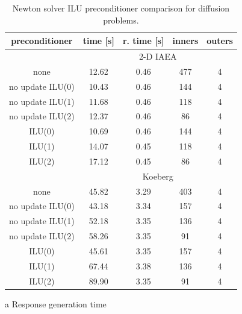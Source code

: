 \begin{table}[ht] 
 \begin{center} 
 
 \begin{threeparttable}

 \begin{tabular}{ccccc} 
 \toprule 
  preconditioner & time [s] & r. time [s]\tnote{a} & inners & outers \\
 \midrule 
 &  \multicolumn{4}{c}{2-D IAEA} \\ 
 \midrule 
          none &     12.62 &      0.46 &          477 &            4 \\ 
  no update ILU(0) &     10.43 &      0.46 &          144 &            4 \\ 
  no update ILU(1) &     11.68 &      0.46 &          118 &            4 \\ 
  no update ILU(2) &     12.37 &      0.46 &           86 &            4 \\ 
        ILU(0) &     10.69 &      0.46 &          144 &            4 \\ 
        ILU(1) &     14.07 &      0.45 &          118 &            4 \\ 
        ILU(2) &     17.12 &      0.45 &           86 &            4 \\ 
 \midrule 
 &  \multicolumn{4}{c}{Koeberg} \\ 
 \midrule 
          none &     45.82 &      3.29 &          403 &            4 \\ 
  no update ILU(0) &     43.18 &      3.34 &          157 &            4 \\ 
  no update ILU(1) &     52.18 &      3.35 &          136 &            4 \\ 
  no update ILU(2) &     58.26 &      3.35 &           91 &            4 \\ 
        ILU(0) &     45.61 &      3.35 &          157 &            4 \\ 
        ILU(1) &     67.44 &      3.38 &          136 &            4 \\ 
        ILU(2) &     89.90 &      3.35 &           91 &            4 \\ 
 \bottomrule 
 \end{tabular} 
 

 {\footnotesize
 \begin{tablenotes}
   \item[a] Response generation time
 \end{tablenotes}
 }
 \end{threeparttable}
 
 
 \end{center} 
 \caption{Newton solver ILU preconditioner comparison for diffusion 
          problems.} 
 \label{tbl:diffusion_newton_pc_study} 
\end{table} 

